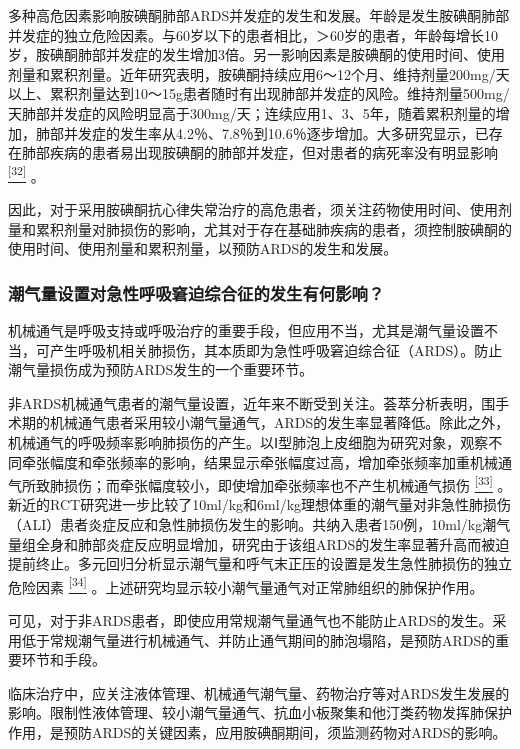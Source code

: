 多种高危因素影响胺碘酮肺部ARDS并发症的发生和发展。年龄是发生胺碘酮肺部并发症的独立危险因素。与60岁以下的患者相比，＞60岁的患者，年龄每增长10岁，胺碘酮肺部并发症的发生增加3倍。另一影响因素是胺碘酮的使用时间、使用剂量和累积剂量。近年研究表明，胺碘酮持续应用6～12个月、维持剂量200mg/天以上、累积剂量达到10～15g患者随时有出现肺部并发症的风险。维持剂量500mg/天肺部并发症的风险明显高于300mg/天；连续应用1、3、5年，随着累积剂量的增加，肺部并发症的发生率从4.2％、7.8％到10.6％逐步增加。大多研究显示，已存在肺部疾病的患者易出现胺碘酮的肺部并发症，但对患者的病死率没有明显影响
\protect\hyperlink{text00011.htmlux5cux23ch32-10}{\textsuperscript{{[}32{]}}}
。

因此，对于采用胺碘酮抗心律失常治疗的高危患者，须关注药物使用时间、使用剂量和累积剂量对肺损伤的影响，尤其对于存在基础肺疾病的患者，须控制胺碘酮的使用时间、使用剂量和累积剂量，以预防ARDS的发生和发展。

\subsubsection{潮气量设置对急性呼吸窘迫综合征的发生有何影响？}

机械通气是呼吸支持或呼吸治疗的重要手段，但应用不当，尤其是潮气量设置不当，可产生呼吸机相关肺损伤，其本质即为急性呼吸窘迫综合征（ARDS）。防止潮气量损伤成为预防ARDS发生的一个重要环节。

非ARDS机械通气患者的潮气量设置，近年来不断受到关注。荟萃分析表明，围手术期的机械通气患者采用较小潮气量通气，ARDS的发生率显著降低。除此之外，机械通气的呼吸频率影响肺损伤的产生。以Ⅰ型肺泡上皮细胞为研究对象，观察不同牵张幅度和牵张频率的影响，结果显示牵张幅度过高，增加牵张频率加重机械通气所致肺损伤；而牵张幅度较小，即使增加牵张频率也不产生机械通气损伤
\protect\hyperlink{text00011.htmlux5cux23ch33-10}{\textsuperscript{{[}33{]}}}
。新近的RCT研究进一步比较了10ml/kg和6ml/kg理想体重的潮气量对非急性肺损伤（ALI）患者炎症反应和急性肺损伤发生的影响。共纳入患者150例，10ml/kg潮气量组全身和肺部炎症反应明显增加，研究由于该组ARDS的发生率显著升高而被迫提前终止。多元回归分析显示潮气量和呼气末正压的设置是发生急性肺损伤的独立危险因素
\protect\hyperlink{text00011.htmlux5cux23ch34-10}{\textsuperscript{{[}34{]}}}
。上述研究均显示较小潮气量通气对正常肺组织的肺保护作用。

可见，对于非ARDS患者，即使应用常规潮气量通气也不能防止ARDS的发生。采用低于常规潮气量进行机械通气、并防止通气期间的肺泡塌陷，是预防ARDS的重要环节和手段。

临床治疗中，应关注液体管理、机械通气潮气量、药物治疗等对ARDS发生发展的影响。限制性液体管理、较小潮气量通气、抗血小板聚集和他汀类药物发挥肺保护作用，是预防ARDS的关键因素，应用胺碘酮期间，须监测药物对ARDS的影响。

